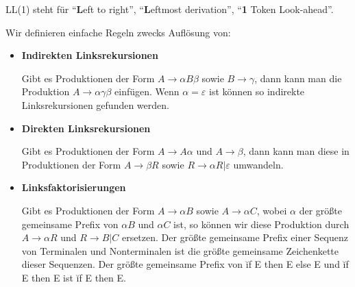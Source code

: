 LL(1) steht für ``\textbf{L}eft to right'', ``\textbf{L}eftmost derivation'', ``\textbf{1} Token Look-ahead''.

Wir definieren einfache Regeln zwecks Auflösung von:
\begin{itemize}
\item \textbf{Indirekten Linksrekursionen}

Gibt es Produktionen der Form $A \to \alpha B \beta$ sowie $B \to \gamma$, dann kann man die Produktion
$A \to \alpha \gamma \beta$ einfügen. Wenn $\alpha=\varepsilon$ ist können so indirekte Linksrekursionen gefunden werden.
\item \textbf{Direkten Linksrekursionen}

Gibt es Produktionen der Form $A \to A \alpha$ und $A \to \beta$, dann kann man diese in Produktionen der Form $A \to \beta R$ sowie 
$R \to \alpha R | \varepsilon$ umwandeln.
\item \textbf{Linksfaktorisierungen}

Gibt es Produktionen der Form $A \to \alpha B$ sowie $A \to \alpha C$, wobei $\alpha$ der größte gemeinsame Prefix von $\alpha B$ und $\alpha C$ ist,
so können wir diese Produktion durch $A \to \alpha R$ und $R \to B | C$ ersetzen. Der größte gemeinsame Prefix einer Sequenz von Terminalen und Nonterminalen ist die größte
gemeinsame Zeichenkette dieser Sequenzen. Der größte gemeinsame Prefix von \u{if E then E else E} und \u{if E then E} ist \u{if E then E}.

\end{itemize}

